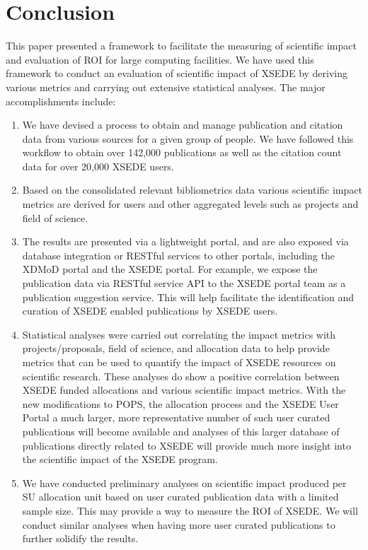 \documentclass{tex/sig-alternate}
\begin{document}
\section{Conclusion} \label{S:conclusion}

This paper presented a framework to facilitate the measuring of scientific impact and evaluation of ROI for large computing facilities. We have used this framework to conduct an evaluation of scientific impact of XSEDE by deriving various metrics and carrying out extensive statistical analyses. The major accomplishments include:
\begin{enumerate}
\item We have devised a process to obtain and manage publication and citation data from various sources for a given group of people. We have followed this workflow to obtain over 142,000 publications as well as the citation count data for over 20,000 XSEDE users.
\item Based on the consolidated relevant bibliometrics data various scientific impact metrics are derived for users and other aggregated levels such as projects and field of science.
\item The results are presented via a lightweight portal, and are also exposed via database integration or RESTful services to other portals, including the XDMoD portal and the XSEDE portal. For example, we expose the publication data via RESTful service API to the XSEDE portal team as a publication suggestion service. This will help facilitate the identification and curation of XSEDE enabled publications by XSEDE users.
\item Statistical analyses were carried out correlating the impact metrics with projects/proposals, field of science, and allocation data to help provide metrics that can be used to quantify the impact of XSEDE resources on scientific research. These analyses do show a positive correlation between XSEDE funded allocations and various scientific impact metrics. With the new modifications to POPS, the allocation process and the XSEDE User Portal a much larger, more representative number of such user curated publications will become available and analyses of this larger database of publications directly related to XSEDE will provide much more insight into the scientific impact of the XSEDE program.
\item We have conducted preliminary analyses on scientific impact produced per SU allocation unit based on user curated publication data with a limited sample size. This may provide a way to measure the ROI of XSEDE. We will conduct similar analyses when having more user curated publications to further solidify the results.

\end{enumerate} 
\end{document}
